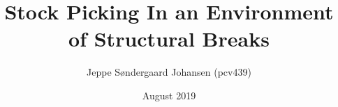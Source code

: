 \documentclass{article}
\title{Stock Picking In an Environment of Structural Breaks}
\author{Jeppe Søndergaard Johansen (pcv439)}
\date{August 2019}
\begin{document}
\maketitle


\tableofcontents

\pagebreak

%


















\newpage
\end{document}
